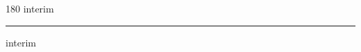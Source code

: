 
\begin{frame}
\begin{center}
\begin{turn}{180}
{\fontsize{2.5cm}{1em}\selectfont interim}
\end{turn}
\vspace{1em}\par  
\hrule
\vspace{1em}\par  
{\fontsize{2.5cm}{1em}\selectfont interim}
\end{center}
\end{frame}
